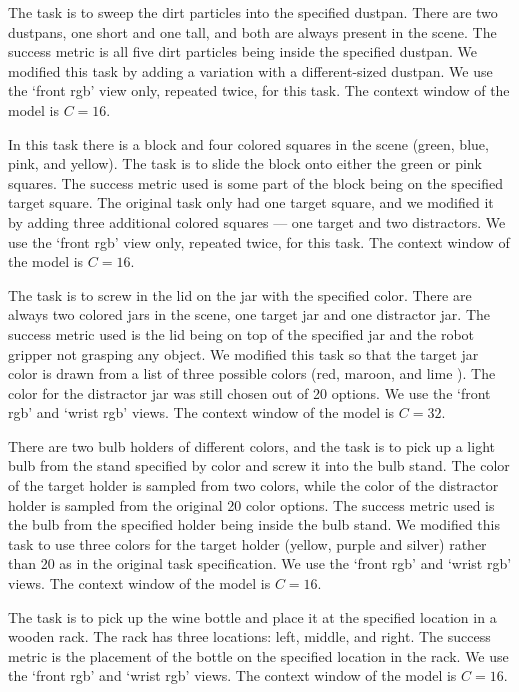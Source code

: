  The task is to sweep the dirt particles into the specified dustpan. There are two dustpans, one short and one tall, and both are always present in the scene. The success metric is all five dirt particles being inside the specified dustpan. We modified this task by adding a variation with a different-sized dustpan. We use the `front rgb' view only, repeated twice, for this task. The context window  of the model is $C = 16$.


 In this task there is a block and four colored squares in the scene (green, blue, pink, and yellow). The task is to slide the block onto either the green or pink squares. The success metric used is some part of the block being on the specified target square. The original task only had one target square, and we modified it by adding three additional colored squares --- one target and two distractors. We use the `front rgb' view only, repeated twice, for this task. The context window  of the model is $C = 16$.

  The task is to screw in the lid on the jar with the specified color. There are always two colored jars in the scene, one target jar and one distractor jar. The success metric used is the lid being on top of the specified jar and the robot gripper not grasping any object. We modified this task so that the target jar color is drawn from a list of three possible colors (red, maroon, and lime ). The color for the distractor jar was still chosen out of 20 options. We use the `front rgb' and `wrist rgb' views. The context window  of the model is $C = 32$.

 There are two bulb holders of different colors, and the task is to pick up a light bulb from the stand specified by color and screw it into the bulb stand. The color of the target holder is sampled from two colors, while the color of the distractor holder is sampled from the original 20 color options. The success metric used is the bulb from the specified holder being inside the bulb stand. We modified this task to use three colors for the target holder (yellow, purple and silver) rather than 20 as in the original task specification. We use the `front rgb' and `wrist rgb' views. The context window  of the model is $C = 16$.

  The task is to pick up the wine bottle and place it at the specified location in a wooden rack. The rack has three locations: left, middle, and right. The success metric is the placement of the bottle on the specified location in the rack. We use the `front rgb' and `wrist rgb' views. The context window  of the model is $C = 16$.

